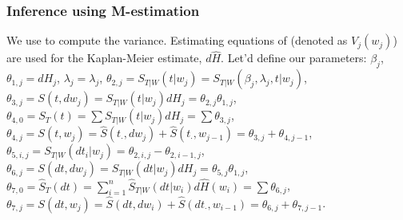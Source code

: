 \documentclass[]{article}\usepackage[]{graphicx}\usepackage[]{color}
\begin{document}
\subsubsection{Inference using M-estimation}

We use \cite{stefanski2002calculus} to compute the variance. Estimating equations of \cite{stute1995central} (denoted as $V _j(w_j)$) are used for the Kaplan-Meier estimate, $d\widehat{H}$. Let'd define our parameters: $\beta_j$, $\theta_{1,j} = dH _j$, $\lambda_j = \lambda _j$,
$\theta_{2,j} = S_{T|W}(t|w_j) = S_{T|W}(\beta_j, \lambda_j, t|w_j)$,
$\theta_{3,j} = S (t,dw_j) = S_{T|W}(t|w_j)dH_j = \theta_{2,j} \theta_{1,j}$,
 $\theta_{4,0} = S_T(t) = \sum S_{T|W}(t|w_j)dH _j = \sum \theta_{3,j}$,
 $\theta_{4,j} = S (t, w_j)= \widehat{S} (t_{\cdot}, dw_j) + \widehat{S} (t_{\cdot}, w_{j-1}) = \theta_{3,j} + \theta_{4,j-1}$,
 $\theta_{5,i,j} = S_{T|W}(dt_i|w_j) = \theta_{2, i,j} - \theta_{2, i-1,j}$,
 $\theta_{6,j} = S (dt, dw_j) =  S_{T|W}(dt|w_j)dH_j = \theta_{5,j} \theta_{1,j}$,
 $\theta_{7,0} = \widehat{S}_{T}(dt) = \sum_{i=1}^n \widehat{S}_{T|W}(dt|w_i)d\widehat{H}(w_i) = \sum \theta_{6,j}$,
 $\theta_{7,j} = S (dt, w_j) = \widehat{S} (dt, dw_i) + \widehat{S} (dt_{\cdot}, w_{i-1}) = \theta_{6,j} + \theta_{7,j-1}$.
\end{document}
